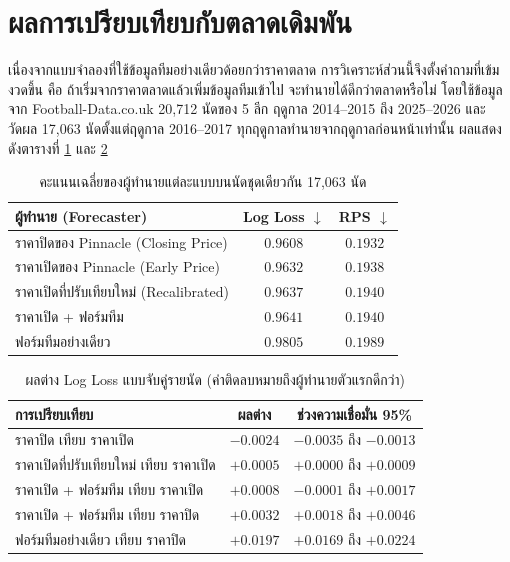 \section{ผลการเปรียบเทียบกับตลาดเดิมพัน}

เนื่องจากแบบจำลองที่ใช้ข้อมูลทีมอย่างเดียวด้อยกว่าราคาตลาด การวิเคราะห์ส่วนนี้จึงตั้งคำถามที่เข้มงวดขึ้น คือ ถ้าเริ่มจากราคาตลาดแล้วเพิ่มข้อมูลทีมเข้าไป จะทำนายได้ดีกว่าตลาดหรือไม่ โดยใช้ข้อมูลจาก Football-Data.co.uk 20,712 นัดของ 5 ลีก ฤดูกาล 2014--2015 ถึง 2025--2026 และวัดผล 17,063 นัดตั้งแต่ฤดูกาล 2016--2017 ทุกฤดูกาลทำนายจากฤดูกาลก่อนหน้าเท่านั้น ผลแสดงดังตารางที่ \ref{tab:market_forecasters} และ \ref{tab:market_diff}

\begin{table}[htbp]
\centering
\caption{คะแนนเฉลี่ยของผู้ทำนายแต่ละแบบบนนัดชุดเดียวกัน 17,063 นัด}
\label{tab:market_forecasters}
\begin{tabular}{|l|c|c|}
\hline
\textbf{ผู้ทำนาย (Forecaster)} & \textbf{Log Loss} $\downarrow$ & \textbf{RPS} $\downarrow$ \\
\hline
ราคาปิดของ Pinnacle (Closing Price) & $\mathbf{0.9608}$ & $\mathbf{0.1932}$ \\
ราคาเปิดของ Pinnacle (Early Price) & $0.9632$ & $0.1938$ \\
ราคาเปิดที่ปรับเทียบใหม่ (Recalibrated) & $0.9637$ & $0.1940$ \\
ราคาเปิด + ฟอร์มทีม & $0.9641$ & $0.1940$ \\
ฟอร์มทีมอย่างเดียว & $0.9805$ & $0.1989$ \\
\hline
\end{tabular}
\end{table}

\begin{table}[htbp]
\centering
\caption{ผลต่าง Log Loss แบบจับคู่รายนัด (ค่าติดลบหมายถึงผู้ทำนายตัวแรกดีกว่า)}
\label{tab:market_diff}
\begin{tabular}{|l|c|c|}
\hline
\textbf{การเปรียบเทียบ} & \textbf{ผลต่าง} & \textbf{ช่วงความเชื่อมั่น 95\%} \\
\hline
ราคาปิด เทียบ ราคาเปิด & $-0.0024$ & $-0.0035$ ถึง $-0.0013$ \\
ราคาเปิดที่ปรับเทียบใหม่ เทียบ ราคาเปิด & $+0.0005$ & $+0.0000$ ถึง $+0.0009$ \\
ราคาเปิด + ฟอร์มทีม เทียบ ราคาเปิด & $+0.0008$ & $-0.0001$ ถึง $+0.0017$ \\
ราคาเปิด + ฟอร์มทีม เทียบ ราคาปิด & $+0.0032$ & $+0.0018$ ถึง $+0.0046$ \\
ฟอร์มทีมอย่างเดียว เทียบ ราคาปิด & $+0.0197$ & $+0.0169$ ถึง $+0.0224$ \\
\hline
\end{tabular}
\end{table}

